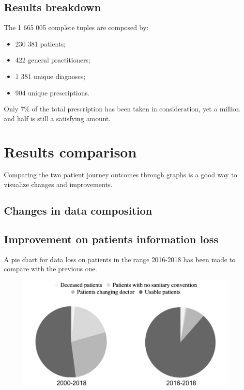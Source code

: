 \subsection{Results breakdown}
The 1 665 005 complete tuples are composed by:
\begin{itemize}
	\item 230 381 patients;
	\item 422 general practitioners;
	\item 1 381 unique diagnoses;
	\item 904 unique prescriptions.
\end{itemize}

Only 7\% of the total prescription has been taken in consideration, yet a million and half is still a satisfying amount.

\section{Results comparison}
Comparing the two patient journey outcomes through graphs is a good way to visualize changes and improvements.

\subsection{Changes in data composition}

\subsection{Improvement on patients information loss}
A pie chart for data loss on patients in the range 2016-2018 has been made to compare with the previous one.

\begin{figure}[h]
	\centering
	\includegraphics[scale=0.5]{images/pies.png}
\end{figure}

